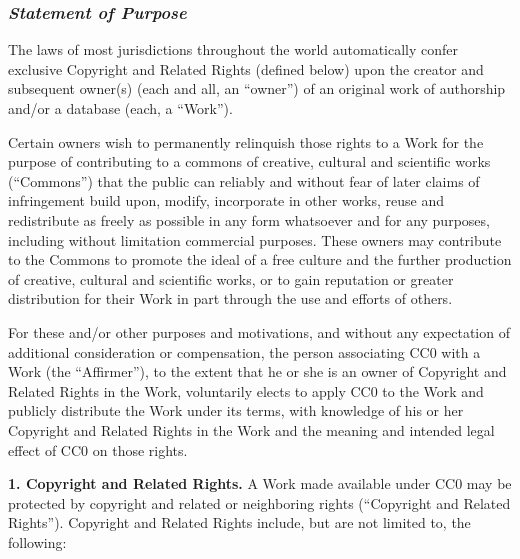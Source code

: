 \subsubsection{\emph{Statement of Purpose}}
\par The laws of most jurisdictions throughout the world
automatically confer exclusive Copyright and Related Rights
(defined below) upon the creator and subsequent owner(s) (each
and all, an ``owner'') of an original work of authorship and/or
a database (each, a ``Work'').
\par Certain owners wish to permanently relinquish those rights
to a Work for the purpose of contributing to a commons of
creative, cultural and scientific works (``Commons'') that the
public can reliably and without fear of later claims of
infringement build upon, modify, incorporate in other works,
reuse and redistribute as freely as possible in any form
whatsoever and for any purposes, including without limitation
commercial purposes. These owners may contribute to the
Commons to promote the ideal of a free culture and the further
production of creative, cultural and scientific works, or to
gain reputation or greater distribution for their Work in part
through the use and efforts of others.
\par For these and/or other purposes and motivations, and
without any expectation of additional consideration or
compensation, the person associating CC0 with a Work (the
``Affirmer''), to the extent that he or she is an owner of
Copyright and Related Rights in the Work, voluntarily elects
to apply CC0 to the Work and publicly distribute the Work
under its terms, with knowledge of his or her Copyright and
Related Rights in the Work and the meaning and intended legal
effect of CC0 on those rights.
\par \textbf{1. Copyright and Related Rights.}
A Work made available under CC0 may be protected by
copyright and related or neighboring rights (``Copyright and
 Related Rights''). Copyright and Related Rights include, but
are not limited to, the following:

